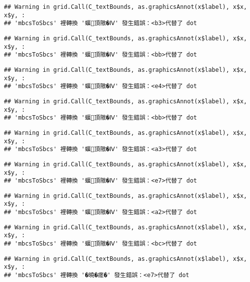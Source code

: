 \documentclass[
]{article}
\begin{document}
\begin{verbatim}
## Warning in grid.Call(C_textBounds, as.graphicsAnnot(x$label), x$x, x$y, :
## 'mbcsToSbcs' 裡轉換 '蝘頂隞�Ⅳ' 發生錯誤：<b3>代替了 dot
\end{verbatim}

\begin{verbatim}
## Warning in grid.Call(C_textBounds, as.graphicsAnnot(x$label), x$x, x$y, :
## 'mbcsToSbcs' 裡轉換 '蝘頂隞�Ⅳ' 發生錯誤：<bb>代替了 dot
\end{verbatim}

\begin{verbatim}
## Warning in grid.Call(C_textBounds, as.graphicsAnnot(x$label), x$x, x$y, :
## 'mbcsToSbcs' 裡轉換 '蝘頂隞�Ⅳ' 發生錯誤：<e4>代替了 dot
\end{verbatim}

\begin{verbatim}
## Warning in grid.Call(C_textBounds, as.graphicsAnnot(x$label), x$x, x$y, :
## 'mbcsToSbcs' 裡轉換 '蝘頂隞�Ⅳ' 發生錯誤：<bb>代替了 dot
\end{verbatim}

\begin{verbatim}
## Warning in grid.Call(C_textBounds, as.graphicsAnnot(x$label), x$x, x$y, :
## 'mbcsToSbcs' 裡轉換 '蝘頂隞�Ⅳ' 發生錯誤：<a3>代替了 dot
\end{verbatim}

\begin{verbatim}
## Warning in grid.Call(C_textBounds, as.graphicsAnnot(x$label), x$x, x$y, :
## 'mbcsToSbcs' 裡轉換 '蝘頂隞�Ⅳ' 發生錯誤：<e7>代替了 dot
\end{verbatim}

\begin{verbatim}
## Warning in grid.Call(C_textBounds, as.graphicsAnnot(x$label), x$x, x$y, :
## 'mbcsToSbcs' 裡轉換 '蝘頂隞�Ⅳ' 發生錯誤：<a2>代替了 dot
\end{verbatim}

\begin{verbatim}
## Warning in grid.Call(C_textBounds, as.graphicsAnnot(x$label), x$x, x$y, :
## 'mbcsToSbcs' 裡轉換 '蝘頂隞�Ⅳ' 發生錯誤：<bc>代替了 dot
\end{verbatim}

\begin{verbatim}
## Warning in grid.Call(C_textBounds, as.graphicsAnnot(x$label), x$x, x$y, :
## 'mbcsToSbcs' 裡轉換 '�曉�瘥�' 發生錯誤：<e7>代替了 dot
\end{verbatim}
\end{document}

